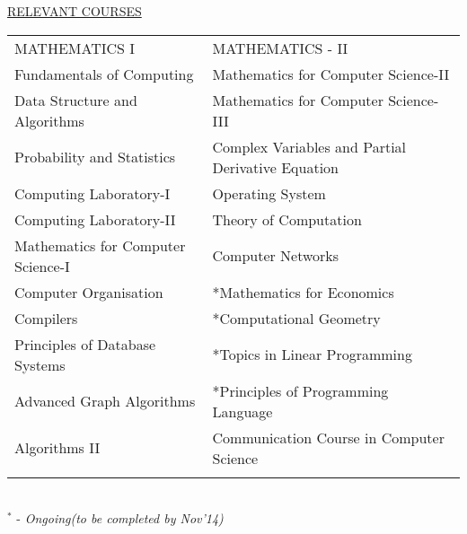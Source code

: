 \documentclass[10pt]{res}
\begin{document}
\begin{resume}
\begin{section}{\underline{RELEVANT COURSES}}
\vspace{.1in}
\begin{tabular}{l l}
MATHEMATICS I & MATHEMATICS - II \\
Fundamentals of Computing & Mathematics for Computer Science-II\\
Data Structure and Algorithms & Mathematics for Computer Science-III\\
Probability and Statistics  & Complex Variables and Partial Derivative Equation\\
Computing Laboratory-I & Operating System\\
Computing Laboratory-II & Theory of Computation\\
Mathematics for Computer Science-I & Computer Networks\\
Computer Organisation & *Mathematics for Economics\\
Compilers & *Computational Geometry \\
Principles of Database Systems & *Topics in Linear Programming \\
Advanced Graph Algorithms & *Principles of Programming Language \\
Algorithms II & Communication Course in Computer Science \\ \\

\end{tabular}
\\
$^{*}$ - \textit{Ongoing(to be completed by Nov'14)}
\end{section}



\end{resume}
\end{document}
